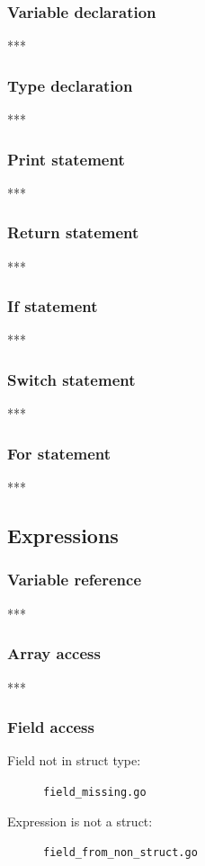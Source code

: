 \documentclass[oneside]{article}
\begin{document}
\subsubsection{Variable declaration}
***

\subsubsection{Type declaration}
***

\subsubsection{Print statement}
***

\subsubsection{Return statement}
***

\subsubsection{If statement}
***

\subsubsection{Switch statement}
***

\subsubsection{For statement}
***


\subsection{Expressions}

\subsubsection{Variable reference}
***

\subsubsection{Array access}
***

\subsubsection{Field access}
\begin{description}
  \item[Field not in struct type:] \verb|field_missing.go|
  \item[Expression is not a struct:] \verb|field_from_non_struct.go|
\end{description}
\end{document}
